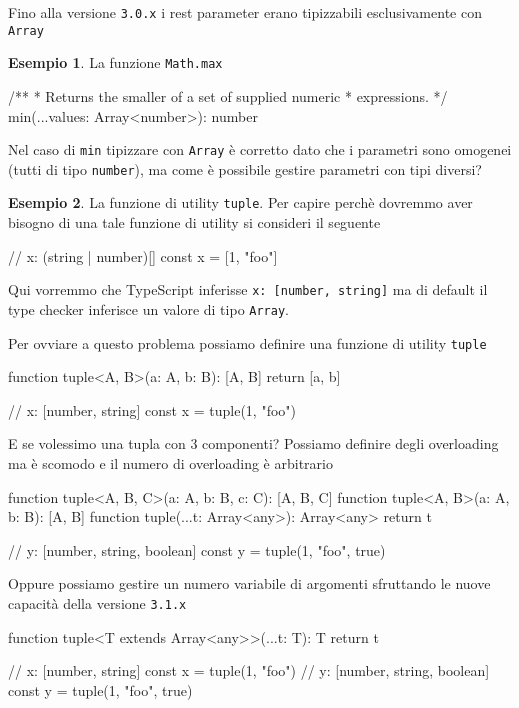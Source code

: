 \documentclass[12pt]{article}
\theoremstyle{definition}
\newtheorem{example}{Esempio}[subsection]
\newenvironment{code}
  {\vspace{0.5cm} \VerbatimEnvironment\begin{typescriptcode}}
  {\end{typescriptcode} \vspace{0.2cm}}
\begin{document}
Fino alla versione \texttt{3.0.x} i rest parameter erano tipizzabili esclusivamente con \texttt{Array}

\begin{example}
La funzione \texttt{Math.max}

\begin{code}
/**
 * Returns the smaller of a set of supplied numeric
 * expressions.
 */
min(...values: Array<number>): number
\end{code}
\end{example}

Nel caso di \texttt{min} tipizzare con \texttt{Array} è corretto dato che i parametri sono omogenei (tutti di tipo \texttt{number}),
ma come è possibile gestire parametri con tipi diversi?

\begin{example}
La funzione di utility \texttt{tuple}. Per capire perchè dovremmo aver bisogno di una tale funzione di utility si consideri il seguente

\begin{code}
// x: (string | number)[]
const x = [1, "foo"]
\end{code}

Qui vorremmo che TypeScript inferisse \texttt{x: [number, string]} ma di default il type checker inferisce un valore di tipo \texttt{Array}.

Per ovviare a questo problema possiamo definire una funzione di utility \texttt{tuple}

\begin{code}
function tuple<A, B>(a: A, b: B): [A, B] {
  return [a, b]
}

// x: [number, string]
const x = tuple(1, "foo")
\end{code}

E se volessimo una tupla con 3 componenti? Possiamo definire degli overloading ma è scomodo e il numero di overloading è arbitrario

\begin{code}
function tuple<A, B, C>(a: A, b: B, c: C): [A, B, C]
function tuple<A, B>(a: A, b: B): [A, B]
function tuple(...t: Array<any>): Array<any> {
  return t
}

// y: [number, string, boolean]
const y = tuple(1, "foo", true)
\end{code}

Oppure possiamo gestire un numero variabile di argomenti sfruttando le nuove capacità della versione \texttt{3.1.x}

\begin{code}
function tuple<T extends Array<any>>(...t: T): T {
  return t
}

// x: [number, string]
const x = tuple(1, "foo")
// y: [number, string, boolean]
const y = tuple(1, "foo", true)
\end{code}

\end{example}
\end{document}
